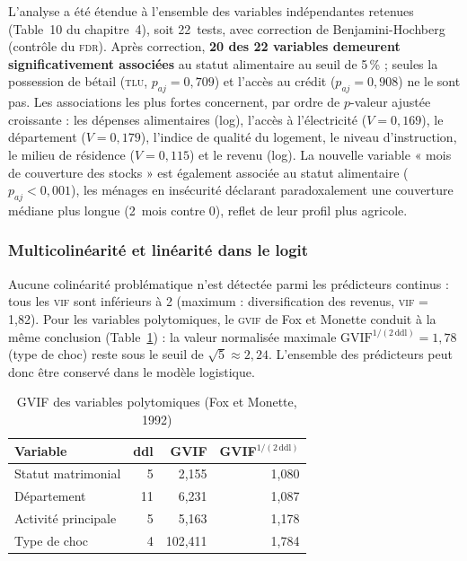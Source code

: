 L'analyse a été étendue à l'ensemble des variables indépendantes retenues
(Table~10 du chapitre~4), soit 22~tests, avec correction de Benjamini-Hochberg
(contrôle du \textsc{fdr}). Après correction, \textbf{20 des 22 variables
demeurent significativement associées} au statut alimentaire au seuil de
5\,\% ; seules la possession de bétail (\textsc{tlu}, $p_{aj} = 0{,}709$) et
l'accès au crédit ($p_{aj} = 0{,}908$) ne le sont pas. Les associations les
plus fortes concernent, par ordre de $p$-valeur ajustée croissante : les
dépenses alimentaires (log), l'accès à l'électricité ($V = 0{,}169$), le
département ($V = 0{,}179$), l'indice de qualité du logement, le niveau
d'instruction, le milieu de résidence ($V = 0{,}115$) et le revenu (log). La
nouvelle variable « mois de couverture des stocks » est également associée au
statut alimentaire ($p_{aj} < 0{,}001$), les ménages en insécurité déclarant
paradoxalement une couverture médiane plus longue (2~mois contre 0), reflet de
leur profil plus agricole.

\subsubsection{Multicolinéarité et linéarité dans le logit}

Aucune colinéarité problématique n'est détectée parmi les prédicteurs continus :
tous les \textsc{vif} sont inférieurs à 2 (maximum : diversification des
revenus, \textsc{vif} = 1,82). Pour les variables polytomiques, le \textsc{gvif}
de Fox et Monette conduit à la même conclusion
(Table~\ref{tab:res-gvif}) : la valeur normalisée maximale
$\text{GVIF}^{1/(2\,\text{ddl})} = 1{,}78$ (type de choc) reste sous le seuil
de $\sqrt{5} \approx 2{,}24$. L'ensemble des prédicteurs peut donc être
conservé dans le modèle logistique.

\begin{table}[H]
\centering
\caption{GVIF des variables polytomiques (Fox et Monette, 1992)}
\label{tab:res-gvif}
\begin{tabular}{lrrr}
\toprule
\textbf{Variable} & \textbf{ddl} & \textbf{GVIF} & \textbf{GVIF$^{1/(2\,\text{ddl})}$} \\
\midrule
Statut matrimonial    &  5 &   2,155 & 1,080 \\
Département           & 11 &   6,231 & 1,087 \\
Activité principale   &  5 &   5,163 & 1,178 \\
Type de choc          &  4 & 102,411 & 1,784 \\
\bottomrule
\end{tabular}
\end{table}

